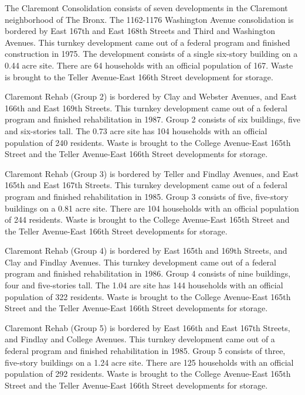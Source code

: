 

The Claremont Consolidation consists of seven developments in the Claremont neighborhood of The Bronx. The 1162-1176 Washington Avenue consolidation is bordered by East 167th and East 168th Streets and Third and Washington Avenues. This turnkey development came out of a federal program and finished construction in 1975. The development consists of a single six-story building on a 0.44 acre site. There are 64 households with an official population of 167. Waste is brought to the Teller Avenue-East 166th Street development for storage.

Claremont Rehab (Group 2) is bordered by Clay and Webster Avenues, and East 166th and East 169th Streets. This turnkey development came out of a federal program and finished rehabilitation in 1987. Group 2 consists of six buildings, five and six-stories tall. The 0.73 acre site has 104 households with an official population of 240 residents. Waste is brought to the College Avenue-East 165th Street and the Teller Avenue-East 166th Street developments for storage.

Claremont Rehab (Group 3) is bordered by Teller and Findlay Avenues, and East 165th and East 167th Streets. This turnkey development came out of a federal program and finished rehabilitation in 1985. Group 3 consists of five, five-story buildings on a 0.81 acre site. There are 104 households with an official population of 244 residents. Waste is brought to the College Avenue-East 165th Street and the Teller Avenue-East 166th Street developments for storage.

Claremont Rehab (Group 4) is bordered by East 165th and 169th Streets, and Clay and Findlay Avenues. This turnkey development came out of a federal program and finished rehabilitation in 1986. Group 4 consists of nine buildings, four and five-stories tall. The 1.04 are site has 144 households with an official population of 322 residents. Waste is brought to the College Avenue-East 165th Street and the Teller Avenue-East 166th Street developments for storage.

Claremont Rehab (Group 5) is bordered by East 166th and East 167th Streets, and Findlay and College Avenues. This turnkey development came out of a federal program and finished rehabilitation in 1985. Group 5 consists of three, five-story buildings on a 1.24 acre site. There are 125 households with an official population of 292 residents. Waste is brought to the College Avenue-East 165th Street and the Teller Avenue-East 166th Street developments for storage.

